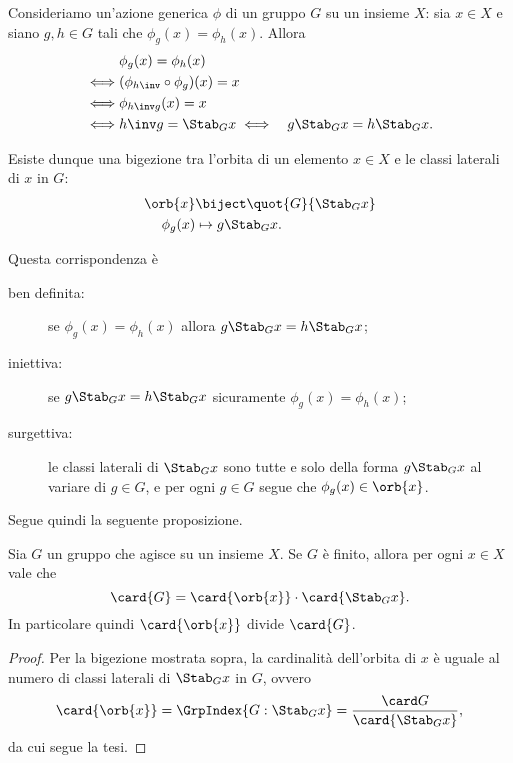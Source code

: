 \begin{remark}
    Consideriamo un'azione generica $\phi$ di un gruppo $G$ su un insieme $X$: sia $x \in X$ e siano $g, h \in G$ tali che $\phi_g(x) = \phi_h(x)$. Allora 
    \begin{align*}
        &\phi_g(x) = \phi_h(x)\\
        \iff &(\phi_{h\inv} \circ \phi_g)(x) = x\\
        \iff &\phi_{h\inv g}(x) = x\\
        \iff &h\inv g = \Stab_{G}{x}
        \iff &g\Stab_{G}{x} = h\Stab_{G}{x}.
    \end{align*}

    Esiste dunque una bigezione tra l'orbita di un elemento $x \in X$ e le classi laterali di $x$ in $G$:
    \begin{align*}
        \orb{x} &\biject \quot{G}{\Stab_{G}{x}}\\
        \phi_g(x) &\mapsto g\Stab_{G}{x}.
    \end{align*}

    Questa corrispondenza è
    \begin{description}
        \item[ben definita:] se $\phi_g(x) = \phi_h(x)$ allora $g\Stab_{G}{x} = h\Stab_{G}{x}$;
        \item[iniettiva:] se $g\Stab_{G}{x} = h\Stab_{G}{x}$ sicuramente $\phi_g(x) = \phi_h(x)$;
        \item[surgettiva:] le classi laterali di $\Stab_{G}{x}$ sono tutte e solo della forma $g\Stab_{G}{x}$ al variare di $g \in G$, e per ogni $g \in G$ segue che $\phi_g(x) \in \orb{x}$.
    \end{description}
\end{remark}

Segue quindi la seguente proposizione.
\begin{proposition}
    \label{prop:lem_orb-stab}
    Sia $G$ un gruppo che agisce su un insieme $X$. Se $G$ è finito, allora per ogni $x \in X$ vale che \begin{equation}
        \card{G} = \card{\orb{x}} \cdot \card{\Stab_{G}{x}}.
    \end{equation}
    In particolare quindi $\card{\orb{x}}$ divide $\card{G}$.
\end{proposition}
\begin{proof}
    Per la bigezione mostrata sopra, la cardinalità dell'orbita di $x$ è uguale al numero di classi laterali di $\Stab_{G}{x}$ in $G$, ovvero \[
        \card{\orb{x}} = \GrpIndex{G : \Stab_{G}{x}} = \frac{\card G}{\card{\Stab_{G}{x}}},    
    \] da cui segue la tesi.
\end{proof}

